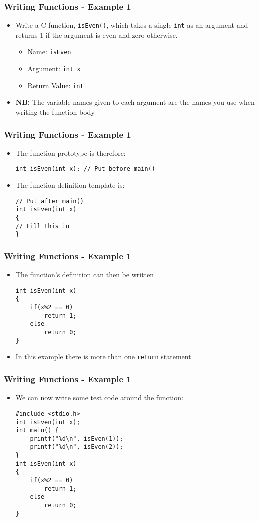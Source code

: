 \documentclass[14pt]{beamer}
\begin{document}
\begin{frame}[fragile]
\frametitle{Writing Functions - Example 1}
\begin{itemize}
\item Write a C function, \texttt{isEven()}, which takes a single \texttt{int} as an argument and returns 1 if the argument is even and zero otherwise.
\pause
	\begin{itemize}
		\item Name: \texttt{isEven}
		\item Argument: \texttt{int x}
		\item Return Value: \texttt{int}
	\end{itemize}
\pause
\item \textbf{NB:} The variable names given to each argument are the names you use when writing the function body
\end{itemize}
\end{frame}

\begin{frame}[fragile]
\frametitle{Writing Functions - Example 1}
\begin{itemize}
\item The function prototype is therefore:
\begin{lstlisting}[style=CStyle]
int isEven(int x); // Put before main()
\end{lstlisting}
\item The function definition template is:
\begin{lstlisting}[style=CStyle]
// Put after main()
int isEven(int x)
{
// Fill this in
}
\end{lstlisting}
\end{itemize}
\end{frame}

\begin{frame}[fragile]
\frametitle{Writing Functions - Example 1}
\begin{itemize}
\item The function's definition can then be written
\begin{lstlisting}[style=CStyle]
int isEven(int x)
{
	if(x%2 == 0)
		return 1;
	else
		return 0;
}
\end{lstlisting}
\item In this example there is more than one \texttt{return} statement
\end{itemize}
\end{frame}

\begin{frame}[fragile]
\frametitle{Writing Functions - Example 1}
\begin{itemize}
\item We can now write some test code around the function:
\begin{lstlisting}[style=CStyle]
#include <stdio.h>
int isEven(int x);
int main() {
	printf("%d\n", isEven(1));
	printf("%d\n", isEven(2));
}
int isEven(int x)
{
	if(x%2 == 0)
		return 1;
	else
		return 0;
}
\end{lstlisting}
\end{itemize}
\end{frame}
\end{document}
